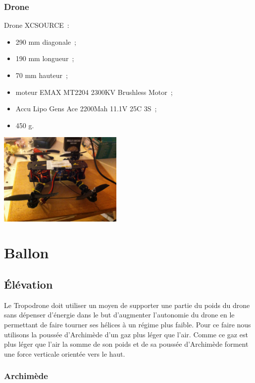 \documentclass[a4paper,11pt]{article}
\begin{document}
\subsubsection{Drone}
\begin{multicols}{2}
	Drone XCSOURCE~: \\
	\begin{itemize}
		\item 290 mm diagonale~;
		\item 190 mm longueur~;
		\item 70 mm hauteur~;
		\item moteur EMAX MT2204 2300KV Brushless Motor~;
		\item Accu Lipo Gens Ace 2200Mah 11.1V 25C 3S~;
		\item 450 g.
	\end{itemize}
	\begin{center}
		\includegraphics[width=6cm]{../Images/drone.JPG}
	\end{center}
\end{multicols}

\newpage

\section{Ballon}

\subsection{Élévation}

Le Tropodrone doit utiliser un moyen de supporter une partie du poids du drone sans dépenser d'énergie dans le but d'augmenter l'autonomie du drone en le permettant de faire tourner ses hélices à un régime plus faible. Pour ce faire nous utilisons la poussée d'Archimède d'un gaz plus léger que l'air. Comme ce gaz est plus léger que l'air la somme de son poids et de sa poussée d'Archimède forment une force verticale orientée vers le haut.

\subsubsection{Archimède}
\end{document}
